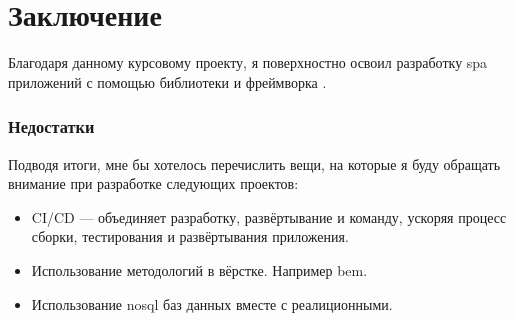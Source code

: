 \section{Заключение}
Благодаря данному курсовому проекту, я поверхностно освоил разработку \acrshort{spa} приложений с помощью библиотеки \textcite{react} и фреймворка \textcite{express}.

\subsubsection{Недостатки}
Подводя итоги, мне бы хотелось перечислить вещи, на которые я буду обращать внимание при разработке следующих проектов:
\begin{itemize}
    \item CI/CD --- объединяет разработку, развёртывание и команду, ускоряя процесс сборки, тестирования и развёртывания приложения.
    \item Использование методологий в вёрстке. Например \acrfull{bem}.
    \item Использование \acrshort{nosql} баз данных вместе с реалиционными.
\end{itemize}

\clearpage